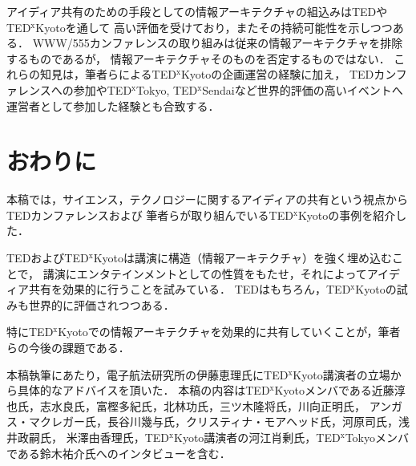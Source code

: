 \documentclass[submit,techreq,jkeyword,noauthor]{ipsj}
\newcommand{\TED}{\textrm{TED}}
\newcommand{\TEDx}{\TED${}^{\textrm{x}}$}
\newcommand{\TEDxTokyo}{\TEDx\textrm{Tokyo}}
\newcommand{\TEDxKyoto}{\TEDx\-\textrm{Kyoto}}
\newcommand{\TEDxSendai}{\TEDx\textrm{Sendai}}
\begin{document}
アイディア共有のための手段としての情報アーキテクチャの組込みは\TED や\TEDxKyoto を通して
高い評価を受けており，またその持続可能性を示しつつある．
WWW/555カンファレンスの取り組みは従来の情報アーキテクチャを排除するものであるが，
情報アーキテクチャそのものを否定するものではない．
これらの知見は，筆者らによる\TEDxKyoto の企画運営の経験に加え，
\TED カンファレンスへの参加や\TEDxTokyo, \TEDxSendai など世界的評価の高いイベントへ
運営者として参加した経験とも合致する．



\section{おわりに}

本稿では，サイエンス，テクノロジーに関するアイディアの共有という視点から\TED カンファレンスおよび
筆者らが取り組んでいる\TEDxKyoto の事例を紹介した．

\TED および\TEDxKyoto は講演に構造（情報アーキテクチャ）を強く埋め込むことで，
講演にエンタテインメントとしての性質をもたせ，それによってアイディア共有を効果的に行うことを試みている．
\TED はもちろん，\TEDxKyoto の試みも世界的に評価されつつある．

特に\TEDxKyoto での情報アーキテクチャを効果的に共有していくことが，筆者らの今後の課題である．

\begin{acknowledgment}
\begingroup\footnotesize
本稿執筆にあたり，電子航法研究所の伊藤恵理氏に\TEDxKyoto 講演者の立場から具体的なアドバイスを頂いた．
本稿の内容は\TEDxKyoto メンバである近藤淳也氏，志水良氏，富樫多紀氏，北林功氏，三ツ木隆将氏，川向正明氏，
アンガス・マクレガー氏，長谷川幾与氏，クリスティナ・モアヘッド氏，河原司氏，浅井政嗣氏，
米澤由香理氏，\TEDxKyoto 講演者の河江肖剰氏，\TEDxTokyo メンバである鈴木祐介氏へのインタビューを含む．
\endgroup
\end{acknowledgment}
\end{document}
